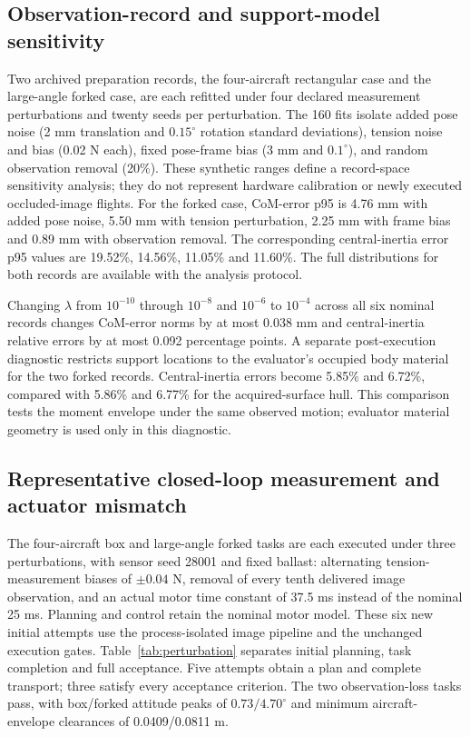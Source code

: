 \subsection{Observation-record and support-model sensitivity}
Two archived preparation records, the four-aircraft rectangular case and the large-angle forked case, are each refitted under four declared measurement perturbations and twenty seeds per perturbation. The 160 fits isolate added pose noise (2 mm translation and $0.15^\circ$ rotation standard deviations), tension noise and bias (0.02 N each), fixed pose-frame bias (3 mm and $0.1^\circ$), and random observation removal (20\%). These synthetic ranges define a record-space sensitivity analysis; they do not represent hardware calibration or newly executed occluded-image flights. For the forked case, CoM-error p95 is 4.76 mm with added pose noise, 5.50 mm with tension perturbation, 2.25 mm with frame bias and 0.89 mm with observation removal. The corresponding central-inertia error p95 values are 19.52\%, 14.56\%, 11.05\% and 11.60\%. The full distributions for both records are available with the analysis protocol.

Changing $\lambda$ from $10^{-10}$ through $10^{-8}$ and $10^{-6}$ to $10^{-4}$ across all six nominal records changes CoM-error norms by at most 0.038 mm and central-inertia relative errors by at most 0.092 percentage points. A separate post-execution diagnostic restricts support locations to the evaluator's occupied body material for the two forked records. Central-inertia errors become 5.85\% and 6.72\%, compared with 5.86\% and 6.77\% for the acquired-surface hull. This comparison tests the moment envelope under the same observed motion; evaluator material geometry is used only in this diagnostic.

\subsection{Representative closed-loop measurement and actuator mismatch}
The four-aircraft box and large-angle forked tasks are each executed under three perturbations, with sensor seed 28001 and fixed ballast: alternating tension-measurement biases of $\pm0.04$ N, removal of every tenth delivered image observation, and an actual motor time constant of 37.5 ms instead of the nominal 25 ms. Planning and control retain the nominal motor model. These six new initial attempts use the process-isolated image pipeline and the unchanged execution gates. Table~\ref{tab:perturbation} separates initial planning, task completion and full acceptance. Five attempts obtain a plan and complete transport; three satisfy every acceptance criterion. The two observation-loss tasks pass, with box/forked attitude peaks of $0.73/4.70^\circ$ and minimum aircraft-envelope clearances of 0.0409/0.0811 m.


